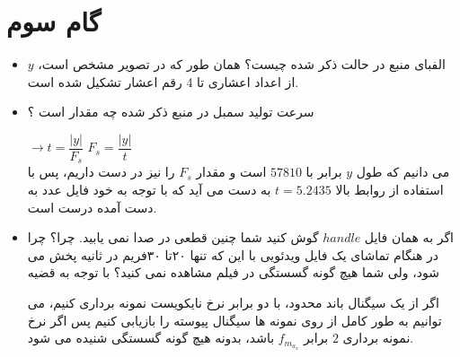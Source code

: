 \def \Subject {گام سوم}


\section{\Subject}

\begin{itemize}
\item 
{
الفبای منبع در حالت ذکر شده چیست؟
همان طور که در تصویر مشخص است، 
\(y\)
از اعداد اعشاری تا 4 رقم اعشار تشکیل شده است.

  \begin{figure}[h!]
    \centering
\end{figure}
}
\item  
{
سرعت تولید سمبل در منبع ذکر شده چه مقدار است ؟

\null \hfill $ \rightarrow t = \dfrac{|y|}{F_s} $ 
\null \hfill $ F_s = \dfrac{|y|}{t} $ \\

می دانیم که طول 
\(y\)
برابر با 
\(57810\)
است و مقدار 
\(F_s\)
را نیز در دست داریم، پس با استفاده از روابط بالا 
\(t = 5.2435\)
به دست می آید که با توجه به خود فایل عدد به دست آمده درست است.
}
\item 
{
اگر به همان فایل  
\(handle\)
گوش کنید شما چنین
قطعی در صدا نمی یابید. چرا؟ چرا در هنگام تماشای یک فایل ویدئویی با این که تنها  ۲۰تا  ۳۰فریم در ثانیه
پخش می شود، ولی شما هیچ گونه گسستگی در فیلم مشاهده نمی کنید؟
با توجه به قضیه 

اگر از یک سیگنال باند محدود، با دو برابر نرخ نایکویست نمونه برداری کنیم، می توانیم به
طور کامل از روی نمونه ها سیگنال پیوسته را بازیابی کنیم
پس اگر نرخ نمونه برداری 
\(2\)
برابر 
\(f_m_a_x\)
باشد، بدونه هیچ گونه گسستگی شنیده می شود.
}
\end{itemize}